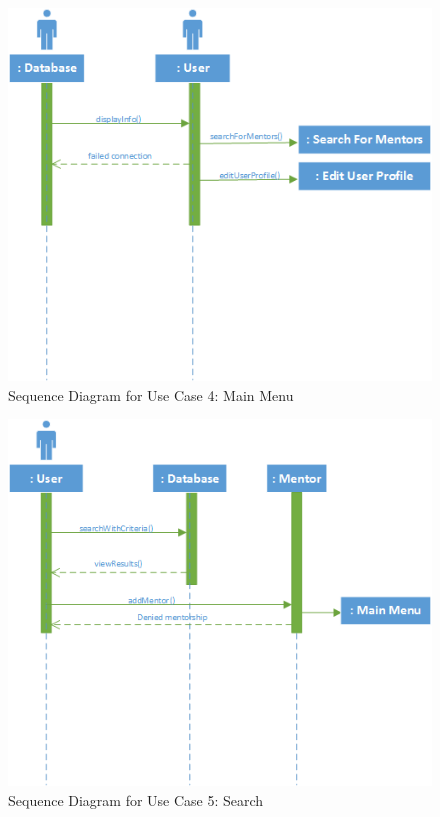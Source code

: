 \documentclass[11pt]{article}
\begin{document}
            \begin{figure}[H]
            \centering
            \includegraphics{SequenceUseCase4MainMenu}
            \caption{Sequence Diagram for Use Case 4: Main Menu}
            \label{SUC4}
            \end{figure}

            \begin{figure}[H]
            \centering
            \includegraphics{SequenceUseCase5Search}
            \caption{Sequence Diagram for Use Case 5: Search}
            \label{SUC5}
            \end{figure}
\end{document}
